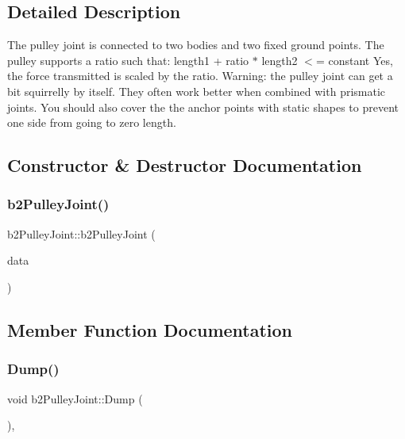 \subsection{Detailed Description}
The pulley joint is connected to two bodies and two fixed ground points. The pulley supports a ratio such that\+: length1 + ratio $\ast$ length2 $<$= constant Yes, the force transmitted is scaled by the ratio. Warning\+: the pulley joint can get a bit squirrelly by itself. They often work better when combined with prismatic joints. You should also cover the the anchor points with static shapes to prevent one side from going to zero length. 

\subsection{Constructor \& Destructor Documentation}
\mbox{\label{classb2_pulley_joint_aca1b8dc6fb05c134ccbc0423674c1867}} 
\subsubsection{\texorpdfstring{b2PulleyJoint()}{b2PulleyJoint()}}
{\footnotesize\ttfamily b2\+Pulley\+Joint\+::b2\+Pulley\+Joint (\begin{DoxyParamCaption}\item[{const \mbox{\hyperlink{structb2_pulley_joint_def}{b2\+Pulley\+Joint\+Def}} $\ast$}]{data }\end{DoxyParamCaption})\hspace{0.3cm}{\ttfamily [protected]}}



\subsection{Member Function Documentation}
\mbox{\label{classb2_pulley_joint_a51b3fa745fc43f806cee1328099b4623}} 
\subsubsection{\texorpdfstring{Dump()}{Dump()}}
{\footnotesize\ttfamily void b2\+Pulley\+Joint\+::\+Dump (\begin{DoxyParamCaption}{ }\end{DoxyParamCaption})\hspace{0.3cm}{\ttfamily [override]}, {\ttfamily [virtual]}}



